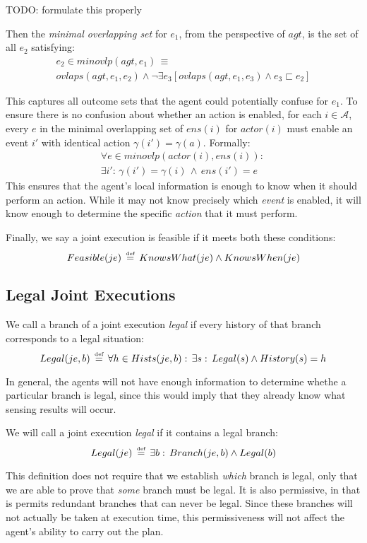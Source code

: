 TODO: formulate this properly

Then the \emph{minimal overlapping set} for $e_{1}$, from the perspective
of $agt$, is the set of all $e_{2}$ satisfying:\begin{multline*}
e_{2}\in minovlp(agt,e_{1})\,\equiv\\
ovlaps(agt,e_{1},e_{2})\wedge\neg\exists e_{3}\left[ovlaps(agt,e_{1},e_{3})\wedge e_{3}\sqsubset e_{2}\right]\end{multline*}


This captures all outcome sets that the agent could potentially confuse
for $e_{1}$. To ensure there is no confusion about whether an action
is enabled, for each $i\in\mathcal{A}$, every $e$ in the minimal
overlapping set of $ens(i)$ for $actor(i)$ must enable an event
$i'$ with identical action $\gamma(i')=\gamma(a)$. Formally:\begin{multline*}
\forall e\in minovlp(actor(i),ens(i)):\,\\
\exists i':\,\gamma(i')=\gamma(i)\,\wedge\, ens(i')=e\end{multline*}
 This ensures that the agent's local information is enough to know
when it should perform an action. While it may not know precisely
which \emph{event} is enabled, it will know enough to determine the
specific \emph{action} that it must perform.

Finally, we say a joint execution is feasible if it meets both these
conditions:\[
Feasible(je)\,\stackrel{\mbox{\tiny def}}{=}\, KnowsWhat(je)\wedge KnowsWhen(je)\]



\subsection{Legal Joint Executions}

We call a branch of a joint execution \emph{legal} if every history
of that branch corresponds to a legal situation:\[
Legal(je,b)\,\stackrel{\mbox{\tiny def}}{=}\,\forall h\in Hists(je,b):\,\exists s:\, Legal(s)\wedge History(s)=h\]


In general, the agents will not have enough information to determine
whethe a particular branch is legal, since this would imply that they
already know what sensing results will occur.

We will call a joint execution \emph{legal} if it contains a legal
branch:\[
Legal(je)\,\stackrel{\mbox{\tiny def}}{=}\,\exists b:\, Branch(je,b)\wedge Legal(b)\]


This definition does not require that we establish \emph{which} branch
is legal, only that we are able to prove that \emph{some} branch must
be legal. It is also permissive, in that is permits redundant branches
that can never be legal. Since these branches will not actually be
taken at execution time, this permissiveness will not affect the agent's
ability to carry out the plan.



